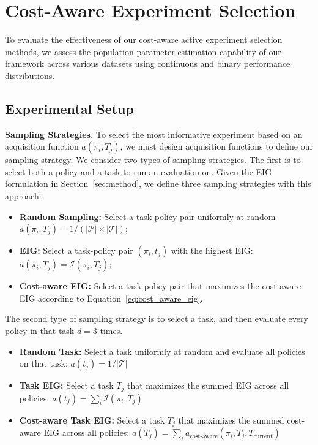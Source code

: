 

\section{Cost-Aware Experiment Selection}

To evaluate the effectiveness of our cost-aware active experiment selection methods, we assess the population parameter estimation capability of our framework across various datasets using continuous and binary performance distributions.


\subsection{Experimental Setup}

\textbf{Sampling Strategies.}
To select the most informative experiment based on an acquisition function $a(\pi_i, T_j)$, we must design acquisition functions to define our sampling strategy.
We consider two types of sampling strategies. 
The first is to select both a policy and a task to run an evaluation on. 
Given the EIG formulation in Section~\ref{sec:method}, we define three sampling strategies with this approach:
\begin{itemize}
    \item \textcolor{rand}{\textbf{Random Sampling:}} Select a task-policy pair uniformly at random $a(\pi_i, T_j)=1/ (|\mathcal{P}| \times |\mathcal{T}|)$;
    \item  \textcolor{eig}{\textbf{EIG:}} Select a task-policy pair $(\pi_i,t_j)$ with the highest EIG: $a(\pi_i, T_j)=\mathcal{I}(\pi_i,T_j)$;
    \item  \textcolor{cost_eig}{\textbf{Cost-aware EIG:}} Select a task-policy pair that maximizes the cost-aware EIG according to Equation~\ref{eq:cost_aware_eig}.
\end{itemize}


The second type of sampling strategy is to select a task, and then evaluate every policy in that task $d=3$ times.

\begin{itemize}
    \item  \textcolor{rand_task}{\textbf{Random Task:}} Select a task uniformly at random and evaluate all policies on that task: $a(t_j) = 1 / |\mathcal{T}|$
    \item  \textcolor{task_eig}{\textbf{Task EIG:}} Select a task $T_j$ that maximizes the summed EIG across all policies: $a(t_j)=\sum_{i} \mathcal{I}(\pi_i,T_j)$
    \item  \textcolor{cost_task_eig}{\textbf{Cost-aware Task EIG:}} Select a task $T_j$ that maximizes the summed cost-aware EIG across all policies: $a(T_j)=\sum_{i} a_{\text{cost-aware}}(\pi_i,T_j, T_\text{current})$
\end{itemize}

